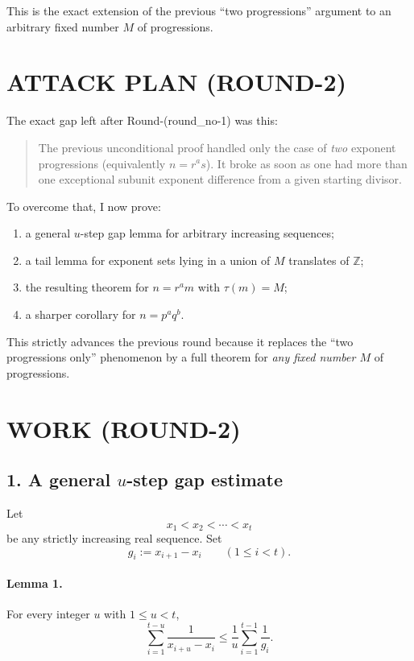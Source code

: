 This is the exact extension of the previous ``two progressions'' argument to an arbitrary fixed number \(M\) of progressions.

\section{ATTACK PLAN (ROUND-2)}

The exact gap left after Round-(round\_no-1) was this:

\begin{quote}
The previous unconditional proof handled only the case of \emph{two} exponent progressions (equivalently \(n=r^a s\)). It broke as soon as one had more than one exceptional subunit exponent difference from a given starting divisor.
\end{quote}

To overcome that, I now prove:

\begin{enumerate}
\item a general \(u\)-step gap lemma for arbitrary increasing sequences;
\item a tail lemma for exponent sets lying in a union of \(M\) translates of \(\mathbb Z\);
\item the resulting theorem for \(n=r^a m\) with \(\tau(m)=M\);
\item a sharper corollary for \(n=p^a q^b\).
\end{enumerate}

This strictly advances the previous round because it replaces the ``two progressions only'' phenomenon by a full theorem for \emph{any fixed number \(M\)} of progressions.

\section{WORK (ROUND-2)}

\subsection*{1. A general \(u\)-step gap estimate}

Let
\[
x_1<x_2<\cdots<x_t
\]
be any strictly increasing real sequence. Set
\[
g_i:=x_{i+1}-x_i \qquad (1\leq i<t).
\]

\paragraph{Lemma 1.}
For every integer \(u\) with \(1\leq u<t\),
\[
\sum_{i=1}^{t-u}\frac{1}{x_{i+u}-x_i}
\leq
\frac1u \sum_{i=1}^{t-1}\frac{1}{g_i}.
\]

